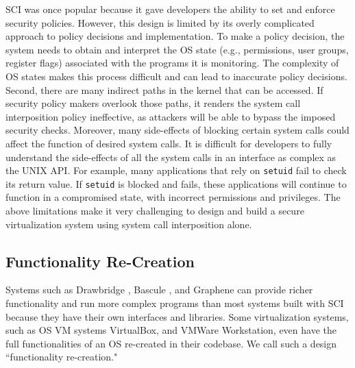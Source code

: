 SCI was once popular
because it gave developers the ability to set and enforce security policies.
However, this design is limited by its overly complicated approach to policy
decisions and implementation.
To make a policy decision, the system needs to
obtain and interpret the OS state (e.g., permissions, user groups, register flags)
associated with the programs it is monitoring.
The complexity of OS states makes this process difficult and can lead to
inaccurate policy decisions.
Second, there are many indirect paths in the kernel that can be accessed.
If security policy makers overlook those paths, it renders the
system call interposition policy ineffective, as attackers will be able to
bypass the imposed security checks.
Moreover, many side-effects of blocking
certain system calls could affect the function of desired system calls.
It is difficult for developers to fully understand the side-effects of all the
system calls in an interface as complex as the UNIX API.
For example, many applications that rely on \texttt{setuid} fail to check its return value.
If \texttt{setuid} is blocked and fails, these applications will continue to function in a compromised state,
with incorrect permissions and privileges.
The above limitations make it very challenging to design and build a secure virtualization system using
system call interposition alone.

\subsection{Functionality Re-Creation}
Systems such as  Drawbridge \cite{Drawbridge-11},
 Bascule \cite{Bascule}, and Graphene \cite{Graphene-14} can
provide richer functionality and run more complex programs than most systems built
with SCI because they have their own
interfaces and libraries. Some virtualization
systems, such as OS VM systems VirtualBox, and VMWare Workstation, even have the
full functionalities of an OS re-created in their codebase. We call such a design
``functionality re-creation."

